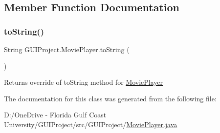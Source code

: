 \subsection{Member Function Documentation}
\mbox{\label{class_g_u_i_project_1_1_movie_player_a58b4ec001538925e955ac6d87824bd43}} 
\subsubsection{\texorpdfstring{toString()}{toString()}}
{\footnotesize\ttfamily String G\+U\+I\+Project.\+Movie\+Player.\+to\+String (\begin{DoxyParamCaption}{ }\end{DoxyParamCaption})}

\begin{DoxyReturn}{Returns}
override of to\+String method for \mbox{\hyperlink{class_g_u_i_project_1_1_movie_player}{Movie\+Player}} 
\end{DoxyReturn}


The documentation for this class was generated from the following file\+:\begin{DoxyCompactItemize}
\item 
D\+:/\+One\+Drive -\/ Florida Gulf Coast University/\+G\+U\+I\+Project/src/\+G\+U\+I\+Project/\mbox{\hyperlink{_movie_player_8java}{Movie\+Player.\+java}}\end{DoxyCompactItemize}
